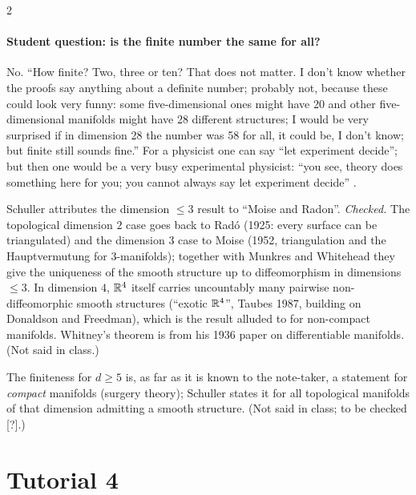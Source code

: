 \begin{paracol}{2}
\paragraph{Student question: is the finite number the same for all?} No. ``How finite? Two, three or ten? That does not matter. I don't know whether the proofs say anything about a definite number; probably not, because these could look very funny: some five-dimensional ones might have 20 and other five-dimensional manifolds might
have 28 different structures; I would be very surprised if in dimension 28 the number was 58 for all, it could be, I don't know; but finite still sounds fine.'' For a physicist one can say ``let experiment decide''; but then one would be a very busy experimental physicist: ``you see, theory does something here for you; you cannot always say let experiment decide''
.

\begin{history}
Schuller attributes the dimension $\le3$ result to ``Moise and Radon''. \emph{Checked.} The topological dimension $2$ case goes back to Rad\'o (1925: every surface can be triangulated) and the dimension $3$ case to Moise (1952, triangulation and the Hauptvermutung for $3$-manifolds); together with Munkres and Whitehead
they give the uniqueness of the smooth structure up to diffeomorphism in dimensions $\le3$. In dimension $4$, $\mathbb{R}^4$ itself carries uncountably many pairwise non-diffeomorphic smooth structures (``exotic $\mathbb{R}^4$'', Taubes 1987, building on Donaldson and Freedman), which is the result alluded to for non-compact manifolds.
Whitney's theorem is from his 1936 paper on differentiable manifolds. (Not said in class.)
\end{history}
\begin{coursenote}
The finiteness for $d\ge5$ is, as far as it is known to the note-taker, a statement for \emph{compact} manifolds (surgery theory); Schuller states it for all topological manifolds of that dimension admitting a smooth structure. (Not said in class; to be checked [?].)
\end{coursenote}

\section{Tutorial 4}\label{sec:t04-1}


\end{paracol}
